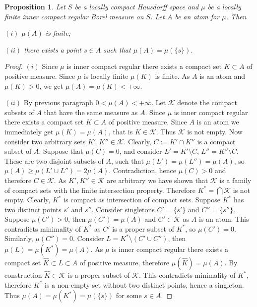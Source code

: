 \documentclass[12pt]{article}
\newtheorem{proposition}[theorem]{Proposition}
\begin{document}
\begin{proposition}\label{MeasAtomCharac} Let $S$ be a locally compact Hausdorff
    space and $\mu$ be a locally finite inner compact regular Borel measure on
    $S$. Let $A$ be an atom for $\mu$. Then

    $(i)$ $\mu(A)$ is finite;

    $(ii)$ there exists a point $s\in A$ such that $\mu(A)=\mu(\{s\})$.
\end{proposition}
\begin{proof} $(i)$ Since $\mu$ is inner compact regular there exists a compact
    set $K\subset A$ of positive measure. Since $\mu$ is locally finite $\mu(K)$
    is finite. As $A$ is an atom and $\mu(K)>0$, we get $\mu(A)=\mu(K)<+\infty$.

    $(ii)$ By previous paragraph $0<\mu(A)<+\infty$. Let $\mathcal{K}$ denote
    the compact subsets of $A$ that have the same measure as $A$. Since $\mu$ is
    inner compact regular there exists a compact set $K\subset A$ of positive
    measure. Since $A$ is an atom we immediately get $\mu(K)=\mu(A)$, that is
    $K\in\mathcal{K}$. Thus $\mathcal{K}$ is not empty. Now consider two
    arbitrary sets $K',K''\in\mathcal{K}$. Clearly, $C:=K'\cap K''$ is a compact
    subset of $A$. Suppose that $\mu(C)=0$, and consider $L'=K'\setminus C$,
    $L''=K''\setminus C$. These are two disjoint subsets of $A$, such that
    $\mu(L')=\mu(L'')=\mu(A)$, so $\mu(A)\geq \mu(L'\cup L'')=2\mu(A)$.
    Contradiction, hence $\mu(C)>0$ and therefore $C\in\mathcal{K}$. As $K',
        K''\in \mathcal{K}$ are arbitrary we have shown that $\mathcal{K}$ is a
    family of compact sets with the finite intersection property. Therefore
    $K^*=\bigcap\mathcal{K}$ is not empty. Clearly, $K^*$ is compact as
    intersection of compact sets. Suppose $K^*$ has two distinct points $s'$ and
    $s''$. Consider singletons $C'=\{s'\}$ and $C''=\{s''\}$. Suppose
    $\mu(C')>0$, then $\mu(C')=\mu(A)$ and $C'\in\mathcal{K}$ as $A$ is an atom.
    This contradicts minimality of $K^*$ as $C'$ is a proper subset of $K^*$, so
    $\mu(C')=0$. Similarly, $\mu(C'')=0$. Consider $L=K^*\setminus (C'\cup
        C'')$, then $\mu(L)=\mu(K^*)=\mu(A)$. As $\mu$ is inner compact regular
    there exists a compact set $\hat{K}\subset L\subset A$ of positive measure,
    therefore $\mu(\hat{K})=\mu(A)$. By construction $\hat{K}\in\mathcal{K}$ is
    a proper subset of $\mathcal{K}$. This contradicts minimality of $K^*$,
    therefore $K^*$ is a non-empty set without two distinct points, hence a
    singleton. Thus $\mu(A)=\mu(K^*)=\mu(\{s\})$ for some $s\in A$.
\end{proof}
\end{document}
